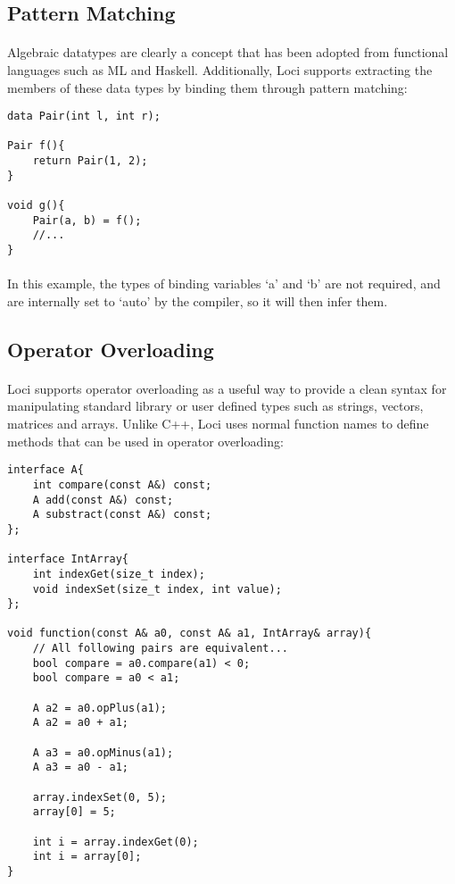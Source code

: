 \documentclass[12pt,twoside,notitlepage]{report}
\begin{document}
\clearpage

\subsection{Pattern Matching}

\paragraph{}
Algebraic datatypes are clearly a concept that has been adopted from functional languages such as ML and Haskell. Additionally, Loci supports extracting the members of these data types by binding them through pattern matching:

\begin{lstlisting}
data Pair(int l, int r);

Pair f(){
	return Pair(1, 2);
}

void g(){
	Pair(a, b) = f();
	//...
}
\end{lstlisting}

\paragraph{}
In this example, the types of binding variables `a' and `b' are not required, and are internally set to `auto' by the compiler, so it will then infer them.

\clearpage

\subsection{Operator Overloading}

\paragraph{}
Loci supports operator overloading as a useful way to provide a clean syntax for manipulating standard library or user defined types such as strings, vectors, matrices and arrays. Unlike C++, Loci uses normal function names to define methods that can be used in operator overloading:


\begin{lstlisting}
interface A{
	int compare(const A&) const;
	A add(const A&) const;
	A substract(const A&) const;
};

interface IntArray{
	int indexGet(size_t index);
	void indexSet(size_t index, int value);
};

void function(const A& a0, const A& a1, IntArray& array){
	// All following pairs are equivalent...
	bool compare = a0.compare(a1) < 0;
	bool compare = a0 < a1;
	
	A a2 = a0.opPlus(a1);
	A a2 = a0 + a1;
	
	A a3 = a0.opMinus(a1);
	A a3 = a0 - a1;
	
	array.indexSet(0, 5);
	array[0] = 5;
	
	int i = array.indexGet(0);
	int i = array[0];
}
\end{lstlisting}
\end{document}
